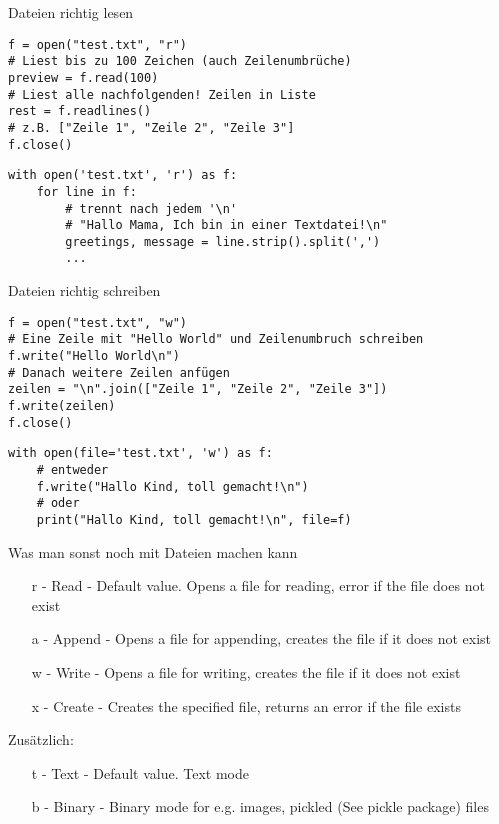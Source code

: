 \begin{frame}[fragile]{Dateien richtig lesen}
\begin{lstlisting}
f = open("test.txt", "r")
# Liest bis zu 100 Zeichen (auch Zeilenumbrüche)
preview = f.read(100)
# Liest alle nachfolgenden! Zeilen in Liste
rest = f.readlines()
# z.B. ["Zeile 1", "Zeile 2", "Zeile 3"]
f.close()
\end{lstlisting}
\pause
\begin{lstlisting}
with open('test.txt', 'r') as f:
	for line in f:
		# trennt nach jedem '\n'
		# "Hallo Mama, Ich bin in einer Textdatei!\n"
		greetings, message = line.strip().split(',')
		...
\end{lstlisting}
\end{frame}

\begin{frame}[fragile]{Dateien richtig schreiben}
\begin{lstlisting}
f = open("test.txt", "w")
# Eine Zeile mit "Hello World" und Zeilenumbruch schreiben
f.write("Hello World\n")
# Danach weitere Zeilen anfügen
zeilen = "\n".join(["Zeile 1", "Zeile 2", "Zeile 3"])
f.write(zeilen)
f.close()
\end{lstlisting}
\pause
\begin{lstlisting}
with open(file='test.txt', 'w') as f:
	# entweder 
	f.write("Hallo Kind, toll gemacht!\n")
	# oder 
	print("Hallo Kind, toll gemacht!\n", file=f)
\end{lstlisting}
\end{frame}

\begin{frame}[fragile]{Was man sonst noch mit Dateien machen kann}
\begin{itemize}
	\item[r] - Read - Default value. Opens a file for reading, error if the file does not exist
	
	\item[a] - Append - Opens a file for appending, creates the file if it does not exist
	
	\item[w] - Write - Opens a file for writing, creates the file if it does not exist
	
	\item[x] - Create - Creates the specified file, returns an error if the file exists
	
\end{itemize}
Zusätzlich:
\begin{itemize}
	\item[t] - Text - Default value. Text mode
	
	\item[b] - Binary - Binary mode for e.g. images, pickled (See pickle package) files
	
\end{itemize}

\end{frame}

